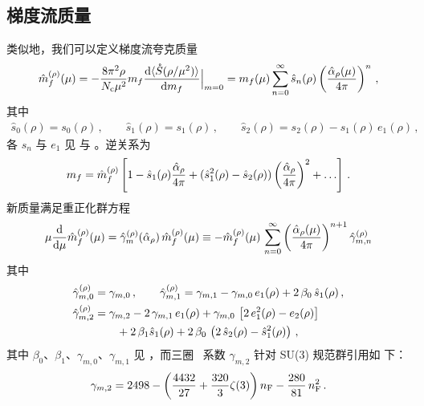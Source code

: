 \subsection{梯度流质量}

类似地，我们可以定义梯度流夸克质量
\begin{equation}
  \begin{split}
    \hat{m}^{(\rho)}_f(\mu) = -\frac{8\pi^2 \rho}{N_\mathrm{c}\mu^2}m_f\frac{{\rm d} \langle
      \mathring{S}(\rho/\mu^2)\rangle}{{\rm d} m_f}\Big|_{m=0} = m_f(\mu)\sum_{n=0}^\infty
    \hat{s}_{n}(\rho)\left(\frac{\hat\alpha_\rho(\mu)}{4\pi}\right)^n\,,
  \end{split}
\end{equation}
其中
\begin{equation}
  \begin{split}
    \hat{s}_{0}(\rho) = s_{0}(\rho)\,,\qquad
    \hat{s}_{1}(\rho) = s_{1}(\rho)\,,\qquad
    \hat{s}_{2}(\rho) = s_{2}(\rho) - s_{1}(\rho)\, e_{1}(\rho)\,,
  \end{split}
\end{equation}
各 $s_{n}$ 与 $e_{1}$ 见  与 。逆关系为
\begin{equation}
  \begin{split}
    m_f = \hat{m}^{(\rho)}_f\left[1-\hat{s}_{1}(\rho)\frac{\hat\alpha_\rho}{4\pi} +
      (\hat{s}_{1}^2(\rho)-\hat{s}_{2}(\rho))
      \left(\frac{\hat\alpha_\rho}{4\pi}\right)^2
      + \ldots\right]\,.
  \end{split}
\end{equation}
新质量满足重正化群方程
\begin{equation}
  \begin{split}
    \mu\frac{{\rm d} }{{\rm d} \mu}\hat{m}^{(\rho)}_f(\mu) = \hat{\gamma}^{(\rho)}_m(\hat\alpha_\rho)\,\hat{m}^{(\rho)}_f(\mu)
   \equiv - \hat{m}^{(\rho)}_f(\mu)\,\sum_{n=0}^\infty
    \left(\frac{\hat\alpha_\rho(\mu)}{4\pi}\right)^{n+1}\hat{\gamma}^{(\rho)}_{m,n}
    \label{eq:rgme}
  \end{split}
\end{equation}
其中
\begin{equation}
  \begin{split}
    \hat{\gamma}^{(\rho)}_{m,0} &= \gamma_{m,0}\,,\qquad
    \hat{\gamma}^{(\rho)}_{m,1} = \gamma_{m,1}
    - \gamma_{m,0}\, e_{1}(\rho)
    + 2\,\beta_0\,\hat{s}_{1}(\rho)
    \,,\\
    \hat{\gamma}^{(\rho)}_{m,2} &=
    \gamma_{m,2}
    - 2\,\gamma_{m,1}\,e_{1}(\rho)
    + \gamma_{m,0}\,\left[2\,e_{1}^2(\rho) - e_{2}(\rho)\right]\\&\qquad
    + 2\,\beta_1\hat{s}_{1}(\rho)
    + 2\,\beta_0\,\left(2\,\hat{s}_{2}(\rho)-\hat{s}^2_1(\rho)\right)\,,
  \end{split}
\end{equation}
其中 $\beta_0$、$\beta_1$、$\gamma_{m,0}$、$\gamma_{m,1}$ 见
，而三圈 \msbar\ 系数 $\gamma_{m,2}$ 针对 SU(3) 规范群引用如
下：
\begin{equation}
  \begin{split}
    \gamma_{m,2} = 2498 -
    \left(\frac{4432}{27}+\frac{320}{3}\zeta(3)\right) n_\mathrm{F} -
    \frac{280}{81}\,n_\mathrm{F}^2\,.
  \end{split}
\end{equation}
